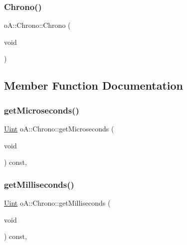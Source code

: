 \subsubsection{\texorpdfstring{Chrono()}{Chrono()}}
{\footnotesize\ttfamily o\+A\+::\+Chrono\+::\+Chrono (\begin{DoxyParamCaption}\item[{void}]{ }\end{DoxyParamCaption})\hspace{0.3cm}{\ttfamily [inline]}}



\subsection{Member Function Documentation}
\mbox{\label{classo_a_1_1_chrono_ac5ed210f5be9e507c95940356338bd88}} 
\subsubsection{\texorpdfstring{get\+Microseconds()}{getMicroseconds()}}
{\footnotesize\ttfamily \mbox{\hyperlink{namespaceo_a_abe1d8250226c5cf34f84d7b75fc7922e}{Uint}} o\+A\+::\+Chrono\+::get\+Microseconds (\begin{DoxyParamCaption}\item[{void}]{ }\end{DoxyParamCaption}) const\hspace{0.3cm}{\ttfamily [inline]}, {\ttfamily [noexcept]}}

\mbox{\label{classo_a_1_1_chrono_ad77117d4c523970030eda4cec93add7c}} 
\subsubsection{\texorpdfstring{get\+Milliseconds()}{getMilliseconds()}}
{\footnotesize\ttfamily \mbox{\hyperlink{namespaceo_a_abe1d8250226c5cf34f84d7b75fc7922e}{Uint}} o\+A\+::\+Chrono\+::get\+Milliseconds (\begin{DoxyParamCaption}\item[{void}]{ }\end{DoxyParamCaption}) const\hspace{0.3cm}{\ttfamily [inline]}, {\ttfamily [noexcept]}}

